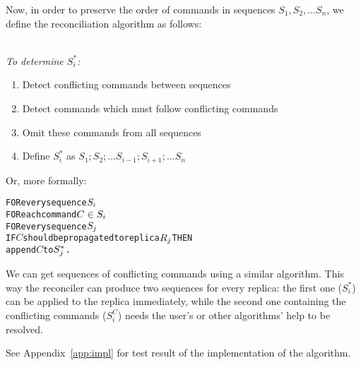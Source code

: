 Now, in order to preserve the order of commands in sequences 
\(S_1, S_2, \ldots S_n\), we define the reconciliation algorithm as follows:
\begin{notrsi}
\\
\emph{To determine \(S_i^*\):}
\begin{enumerate}
\item Detect conflicting commands between sequences
\item Detect commands which must follow conflicting commands
\item Omit these commands from all sequences
\item Define \(S_i^*\) as 
\(S_1; S_2; \ldots S_{i-1}; S_{i+1}; \ldots S_n\)
\end{enumerate}
Or, more formally:
\end{notrsi}
\begin{alltt}
FOR every sequence \(S\sb{i}\)
  FOR each command \(C\in{S}\sb{i}\)  
    FOR every sequence \(S\sb{j}\)
      IF \(C\) should be propagated to replica \(R\sb{j}\) THEN
        append \(C\) to \(S\sb{j}\sp{*}\).
\end{alltt}

We can get sequences of conflicting commands using a similar
algorithm. This way the reconciler can produce two sequences for every replica: the
first one (\(S_i^*\)) can be applied to the replica immediately, while
the second one containing the conflicting commands (\(S_i^C\)) needs the user's or
other algorithms' help to be resolved.

See Appendix~\ref{app:impl} for test result of the implementation of the
algorithm.

